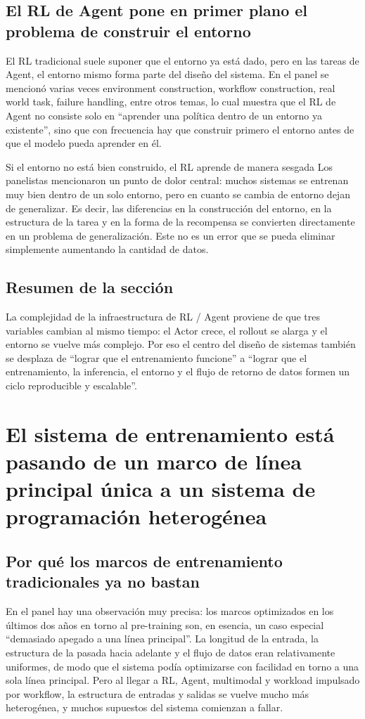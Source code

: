 \documentclass[a4paper]{article}
\begin{document}
\subsection{El RL de Agent pone en primer plano el problema de construir el entorno}
El RL tradicional suele suponer que el entorno ya está dado, pero en las tareas de Agent, el entorno mismo forma parte del diseño del sistema. En el panel se mencionó varias veces environment construction, workflow construction, real world task, failure handling, entre otros temas, lo cual muestra que el RL de Agent no consiste solo en ``aprender una política dentro de un entorno ya existente'', sino que con frecuencia hay que construir primero el entorno antes de que el modelo pueda aprender en él.

\begin{warningbox}{Si el entorno no está bien construido, el RL aprende de manera sesgada}
Los panelistas mencionaron un punto de dolor central: muchos sistemas se entrenan muy bien dentro de un solo entorno, pero en cuanto se cambia de entorno dejan de generalizar. Es decir, las diferencias en la construcción del entorno, en la estructura de la tarea y en la forma de la recompensa se convierten directamente en un problema de generalización. Este no es un error que se pueda eliminar simplemente aumentando la cantidad de datos.
\end{warningbox}

\subsection{Resumen de la sección}
La complejidad de la infraestructura de RL / Agent proviene de que tres variables cambian al mismo tiempo: el Actor crece, el rollout se alarga y el entorno se vuelve más complejo. Por eso el centro del diseño de sistemas también se desplaza de ``lograr que el entrenamiento funcione'' a ``lograr que el entrenamiento, la inferencia, el entorno y el flujo de retorno de datos formen un ciclo reproducible y escalable''.
\section{El sistema de entrenamiento está pasando de un marco de línea principal única a un sistema de programación heterogénea}

\subsection{Por qué los marcos de entrenamiento tradicionales ya no bastan}
En el panel hay una observación muy precisa: los marcos optimizados en los últimos dos años en torno al pre-training son, en esencia, un caso especial ``demasiado apegado a una línea principal''. La longitud de la entrada, la estructura de la pasada hacia adelante y el flujo de datos eran relativamente uniformes, de modo que el sistema podía optimizarse con facilidad en torno a una sola línea principal. Pero al llegar a RL, Agent, multimodal y workload impulsado por workflow, la estructura de entradas y salidas se vuelve mucho más heterogénea, y muchos supuestos del sistema comienzan a fallar.
\end{document}

